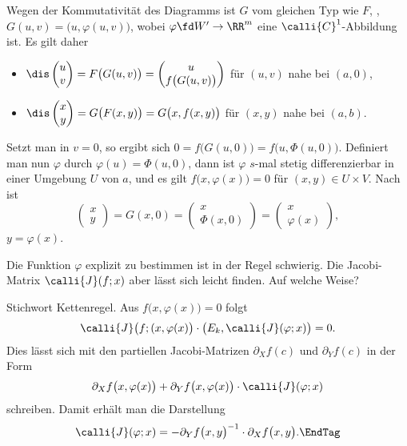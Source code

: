 \begin{antwort}
  Wegen der Kommutativität des Diagramms ist $G$ vom gleichen Typ 
  wie $F$, {\dasheisst}, $G(u,v)=\big( u, \varphi(u,v) \big)$, wobei 
  $\varphi \fd W' \to \RR^m$ eine $\calli{C}^1$-Abbildung ist. Es gilt 
  daher 
  \begin{itemize}[2mm]
  \item[\desc{1}] 
    $\dis \begin{pmatrix} u \\ v \end{pmatrix} = F\big( G(u,v) \big) = 
    \begin{pmatrix} u \\ f\big( G(u,v) \big) \end{pmatrix} $ 
    für $(u,v)$ nahe bei $(a,0)$, \\[2mm] 
  \item[\desc{2}] 
    $\dis \begin{pmatrix} x \\ y \end{pmatrix} = G\big( F(x,y) \big) = 
    G \big( x, f(x,y) \big) $ 
    für $(x,y)$ nahe bei $(a,b)$.
  \end{itemize}
  Setzt man in  $v=0$, so ergibt sich $
  0 = f \big( G(u,0) \big)=f \big( u, \Phi(u,0) \big)$. 
  Definiert man nun $\varphi$ durch $\varphi(u)=\Phi( u,0)$, dann ist $\varphi$ 
  $s$-mal stetig differenzierbar in einer Umgebung $U$ von $a$, und 
  es gilt $f\big( x, \varphi(x) \big)=0$ für $(x,y)\in U\times V$. 
  Nach  ist 
  \[
  \begin{pmatrix} x \\ y \end{pmatrix} =G(x,0) = 
  \begin{pmatrix} x \\ \Phi(x,0) \end{pmatrix} = 
  \begin{pmatrix} x \\ \varphi(x) \end{pmatrix},
  \]
  {\dasheisst} $y=\varphi(x)$. \AntEnd
\end{antwort}

\begin{frage}
  Die Funktion $\varphi$ explizit zu bestimmen ist in der Regel 
  schwierig. Die Jacobi-Matrix $\calli{J}(f;x)$ 
  aber lässt sich leicht finden. Auf welche Weise?
\end{frage}  

\begin{antwort}
  Stichwort Kettenregel. Aus $f \big( x, \varphi(x) \big)=0$ folgt 
  \[
  \calli{J}\big( f; (x,\varphi(x) \big) \cdot 
  \big( E_k , \calli{J}(\varphi; x) \big)=0.  
  \]
  Dies lässt sich mit den partiellen Jacobi-Matrizen 
  $\partial_X f(c)$ und $\partial_Y f(c)$ in der Form  
  \[
  \partial_X f \big( x, \varphi(x) \big) + 
  \partial_Y f \big( x, \varphi(x) \big) \cdot 
  \calli{J}(\varphi; x)
  \]
  schreiben. Damit erhält man die Darstellung
  \begin{equation}
    \calli{J}(\varphi; x) = 
    - \partial_Y f \big( x, y \big)^{-1} \cdot 
    \partial_X f \big( x, y \big).
    \EndTag 
  \end{equation}
\end{antwort}


